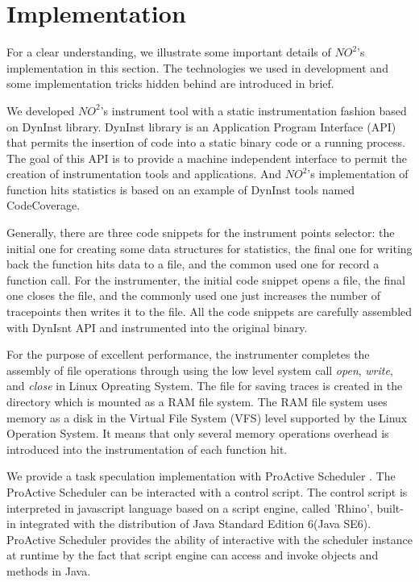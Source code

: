 \section{Implementation} \label{sec-impl}

For a clear understanding, we illustrate some important details of $NO^2$'s implementation
in this section. The technologies we used in development and some implementation tricks
hidden behind are introduced in brief.

We developed $NO^2$'s instrument tool with a static instrumentation fashion based on
DynInst \cite{Dyninst-Deconstruction} library. DynInst library is an Application Program
Interface (API) \cite{dyninstapi} that permits the insertion of code into a static binary
code or a running process. The goal of this API is to provide a machine independent
interface to permit the creation of instrumentation tools and applications. And $NO^2$'s
implementation of function hits statistics is based on an example of DynInst tools named
CodeCoverage.

Generally, there are three code snippets for the instrument points selector: the initial
one for creating some data structures for statistics, the final one for writing back the
function hits data to a file, and the common used one for record a function call. For the
instrumenter, the initial code snippet opens a file, the final one closes the file, and
the commonly used one just increases the number of tracepoints then writes it
to the file. All the code snippets are carefully assembled with DynIsnt API and
instrumented into the original binary.

For the purpose of excellent performance, the instrumenter completes the assembly of file
operations through using the low level system call \emph{open}, \emph{write}, and \emph{close} in
Linux Opreating System. The file for saving traces is created in the directory which is
mounted as a RAM file system. The RAM file system uses memory as a disk in the Virtual
File System (VFS) level supported by the Linux Operation System. It means that only
several memory operations overhead is introduced into the instrumentation of each function
hit.

We provide a task speculation implementation with ProActive Scheduler
\cite{pascheduling}. The ProActive Scheduler can be interacted with a control script. The
control script is interpreted in javascript language based on a script engine, called
'Rhino', built-in integrated with the distribution of Java Standard Edition 6(Java SE6).
ProActive Scheduler provides the ability of interactive with the scheduler instance at
runtime by the fact that script engine can access and invoke objects and methods in
Java.

